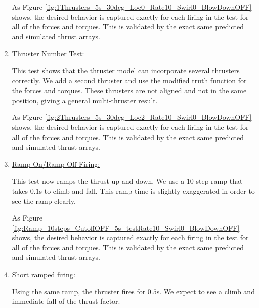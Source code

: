 \begin{enumerate}
	As Figure \ref{fig:1Thrusters_5s_30deg_Loc0_Rate10_Swirl0_BlowDownOFF} shows, the desired behavior is captured exactly for each
	firing in the test for all of the forces and torques. This is validated by the exact same predicted and simulated thrust arrays.

	\item{\underline{Thruster Number Test:} }

	

	This test shows that the thruster model can incorporate several thrusters correctly. We add a second thruster and use the modified truth function for the forces and torques. These thrusters are not aligned and not in the same position, giving a general multi-thruster result.

	

	As Figure \ref{fig:2Thrusters_5s_30deg_Loc2_Rate10_Swirl0_BlowDownOFF} shows, the desired behavior is captured exactly for each
	firing in the test for all of the forces and torques. This is validated by the exact same predicted and simulated thrust arrays.

	\item{\underline{Ramp On/Ramp Off Firing:} }

	

	This test now ramps the thrust up and down. We use a 10 step ramp that takes $0.1$s to climb and fall. This ramp time is slightly exaggerated in order to see the ramp clearly.
	

	As Figure \ref{fig:Ramp_10steps_CutoffOFF_5s_testRate10_Swirl0_BlowDownOFF} shows, the desired behavior is captured exactly for each
	firing in the test for all of the forces and torques. This is validated by the exact same predicted and simulated thrust arrays.


	\item{\underline{Short ramped firing:} }

	

	Using the same ramp, the thruster fires for $0.5$s. We expect to see a climb and immediate fall of the thrust factor.

	


\end{enumerate}

